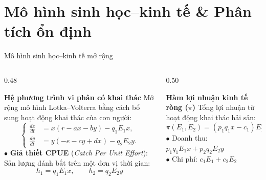 \documentclass[aspectratio=169, 10pt]{beamer}
\begin{document}
\section{Mô hình sinh học--kinh tế \& Phân tích ổn định }

\begin{frame}{Mô hình sinh học--kinh tế mở rộng }
  \begin{columns}[c]
    \begin{column}{0.48\textwidth}
      \begin{block}{\textbf{Hệ phương trình vi phân có khai thác}}
        \footnotesize
        Mở rộng mô hình Lotka--Volterra bằng cách bổ sung hoạt động khai thác của con người:
        \begin{equation}
        \label{eq:ch3_bionomic_system}
        \left\{
        \begin{aligned}
        \frac{dx}{dt} &= x(r - ax - by) - q_1 E_1 x, \\
        \frac{dy}{dt} &= y(-e - cy + dx) - q_2 E_2 y.
        \end{aligned}
        \right.
        \end{equation}
        $\bullet$ \textbf{Giả thiết CPUE} (\textit{Catch Per Unit Effort}):\\
        Sản lượng đánh bắt trên một đơn vị thời gian:
        $$h_1 = q_1 E_1 x, \qquad h_2 = q_2 E_2 y$$
      \end{block}
    \end{column}

    \begin{column}{0.50\textwidth}
      \begin{block}{\textbf{Hàm lợi nhuận kinh tế ròng ($\pi$)}}
        \footnotesize
        Tổng lợi nhuận từ hoạt động khai thác hải sản:
        $$\pi(E_1, E_2) = (p_1 q_1 x - c_1)E_1 + (p_2 q_2 y - c_2)E_2$$
        $\bullet$ Doanh thu: $p_1 q_1 E_1 x + p_2 q_2 E_2 y$\\
        $\bullet$ Chi phí: $c_1 E_1 + c_2 E_2$
      \end{block}

      \vspace{0.1cm}


\end{column}
\end{columns}
\end{frame}
\end{document}
